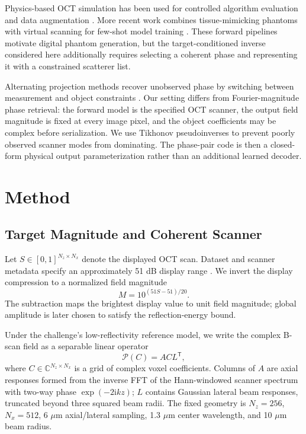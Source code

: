 \documentclass[runningheads]{llncs}
\begin{document}
Physics-based OCT simulation has been used for controlled algorithm evaluation
and data augmentation \cite{sovetsky2025simulation}. More recent work combines
tissue-mimicking phantoms with virtual scanning for few-shot model training
\cite{nikoshin2026phantoms}. These forward pipelines motivate digital phantom
generation, but the target-conditioned inverse considered here additionally
requires selecting a coherent phase and representing it with a constrained
scatterer list.

Alternating projection methods recover unobserved phase by switching between
measurement and object constraints \cite{gerchberg1972practical,fienup1982phase}.
Our setting differs from Fourier-magnitude phase retrieval: the forward model
is the specified OCT scanner, the output field magnitude is fixed at every
image pixel, and the object coefficients may be complex before serialization.
We use Tikhonov pseudoinverses \cite{tikhonov1963regularization} to prevent
poorly observed scanner modes from dominating. The phase-pair code is then a
closed-form physical output parameterization rather than an additional learned
decoder.

\section{Method}

\subsection{Target Magnitude and Coherent Scanner}

Let $S\in[0,1]^{N_z\times N_x}$ denote the displayed OCT scan. Dataset and
scanner metadata specify an approximately 51 dB display range
\cite{matveev2025dataset}. We invert the display compression to a normalized
field magnitude
\begin{equation}
  M = 10^{(51S-51)/20}.
  \label{eq:magnitude}
\end{equation}
The subtraction maps the brightest display value to unit field magnitude;
global amplitude is later chosen to satisfy the reflection-energy bound.

Under the challenge's low-reflectivity reference model, we write the complex
B-scan field as a separable linear operator
\begin{equation}
  \mathcal{P}(C)=A C L^{\mathsf T},
  \label{eq:forward}
\end{equation}
where $C\in\mathbb{C}^{N_z\times N_x}$ is a grid of complex voxel
coefficients. Columns of $A$ are axial responses formed from the inverse FFT of
the Hann-windowed scanner spectrum with two-way phase
$\exp(-2\mathrm{i}kz)$; $L$ contains Gaussian lateral beam responses,
truncated beyond three squared beam radii. The fixed geometry is
$N_z=256$, $N_x=512$, 6 $\mu$m axial/lateral sampling, 1.3 $\mu$m center
wavelength, and 10 $\mu$m beam radius.
\end{document}
